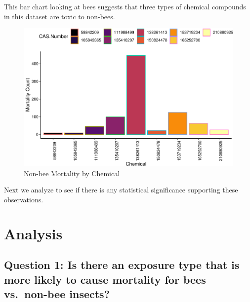 \documentclass[
  12pt,
]{article}
\begin{document}
\newpage

This bar chart looking at bees suggests that three types of chemical
compounds in this dataset are toxic to non-bees.

\begin{figure}
\centering
\includegraphics{UpdatedwithModel_files/figure-latex/non bee chemical-1.pdf}
\caption{Non-bee Mortality by Chemical}
\end{figure}

Next we analyze to see if there is any statistical significance
supporting these observations. \newpage

\hypertarget{analysis}{%
\section{Analysis}\label{analysis}}

\hypertarget{question-1-is-there-an-exposure-type-that-is-more-likely-to-cause-mortality-for-bees-vs.-non-bee-insects}{%
\subsection{Question 1: Is there an exposure type that is more likely to
cause mortality for bees vs.~non-bee
insects?}\label{question-1-is-there-an-exposure-type-that-is-more-likely-to-cause-mortality-for-bees-vs.-non-bee-insects}}
\end{document}
